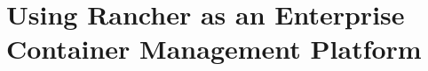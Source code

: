 %
%

\pagebreak
\section{Using Rancher as an Enterprise Container Management Platform}

\onehalfspacing

\blindtext
